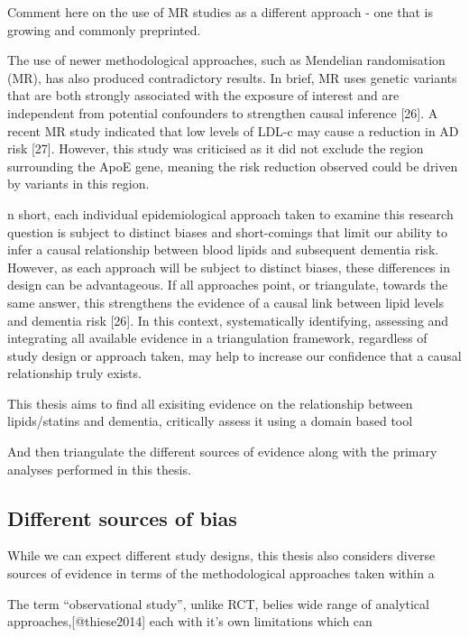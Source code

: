 \documentclass[a4paper,nobind]{templates/ociamthesis}
\begin{document}
Comment here on the use of MR studies as a different approach - one that is growing and commonly preprinted.

The use of newer methodological approaches, such as Mendelian randomisation (MR), has also produced contradictory results. In brief, MR uses genetic variants that are both strongly associated with the exposure of interest and are independent from potential confounders to strengthen causal inference {[}26{]}. A recent MR study indicated that low levels of LDL-c may cause a reduction in AD risk {[}27{]}. However, this study was criticised as it did not exclude the region surrounding the ApoE gene, meaning the risk reduction observed could be driven by variants in this region.

n short, each individual epidemiological approach taken to examine this research question is subject to distinct biases and short-comings that limit our ability to infer a causal relationship between blood lipids and subsequent dementia risk. However, as each approach will be subject to distinct biases, these differences in design can be advantageous. If all approaches point, or triangulate, towards the same answer, this strengthens the evidence of a causal link between lipid levels and dementia risk {[}26{]}. In this context, systematically identifying, assessing and integrating all available evidence in a triangulation framework, regardless of study design or approach taken, may help to increase our confidence that a causal relationship truly exists.

This thesis aims to find all exisiting evidence on the relationship between lipids/statins and dementia, critically assess it using a domain based tool

And then triangulate the different sources of evidence along with the primary analyses performed in this thesis.

\hypertarget{different-sources-of-bias}{%
\subsection{Different sources of bias}\label{different-sources-of-bias}}

While we can expect different study designs, this thesis also considers diverse sources of evidence in terms of the methodological approaches taken within a

The term ``observational study'', unlike RCT, belies wide range of analytical approaches,{[}@thiese2014{]} each with it's own limitations which can
\end{document}
